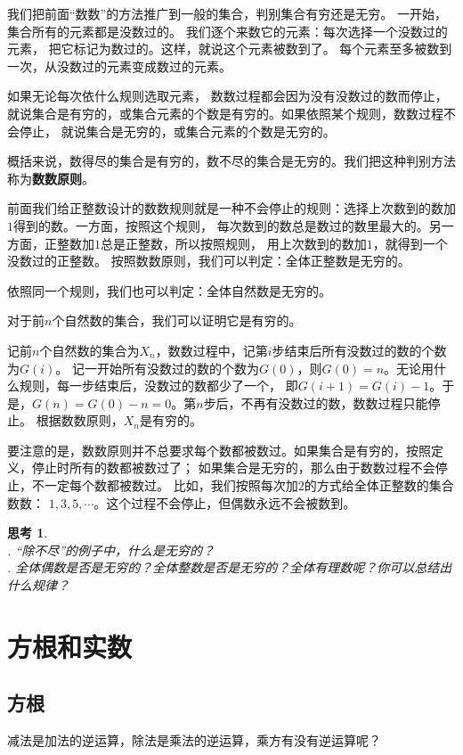 \documentclass[12pt,UTF8]{ctexbook}
\newtheorem{sk}{思考}[section]
\begin{document}
我们把前面“数数”的方法推广到一般的集合，判别集合有穷还是无穷。
一开始，集合所有的元素都是没数过的。
我们逐个来数它的元素：每次选择一个没数过的元素，
把它标记为数过的。这样，就说这个元素被数到了。
每个元素至多被数到一次，从没数过的元素变成数过的元素。

如果无论每次依什么规则选取元素，
数数过程都会因为没有没数过的数而停止，就说集合是有穷的，或集合元素的个数是有穷的。如果依照某个规则，数数过程不会停止，
就说集合是无穷的，或集合元素的个数是无穷的。

概括来说，数得尽的集合是有穷的，数不尽的集合是无穷的。我们把这种判别方法称为\textbf{数数原则}。

前面我们给正整数设计的数数规则就是一种不会停止的规则：选择上次数到的数加$1$得到的数。一方面，按照这个规则，
每次数到的数总是数过的数里最大的。另一方面，正整数加$1$总是正整数，所以按照规则，
用上次数到的数加$1$，就得到一个没数过的正整数。
按照数数原则，我们可以判定：全体正整数是无穷的。

依照同一个规则，我们也可以判定：全体自然数是无穷的。

对于前$n$个自然数的集合，我们可以证明它是有穷的。

记前$n$个自然数的集合为$X_n$，数数过程中，记第$i$步结束后所有没数过的数的个数为$G(i)$。
记一开始所有没数过的数的个数为$G(0)$，则$G(0) = n$。无论用什么规则，每一步结束后，没数过的数都少了一个，
即$G(i+1) = G(i) - 1$。于是，$G(n) = G(0) - n = 0$。第$n$步后，不再有没数过的数，数数过程只能停止。
根据数数原则，$X_n$是有穷的。

要注意的是，数数原则并不总要求每个数都被数过。如果集合是有穷的，按照定义，停止时所有的数都被数过了；
如果集合是无穷的，那么由于数数过程不会停止，不一定每个数都被数过。
比如，我们按照每次加$2$的方式给全体正整数的集合数数：
$1,3,5,\cdots$。这个过程不会停止，但偶数永远不会被数到。

\begin{sk}
    \mbox{}\\
    . “除不尽”的例子中，什么是无穷的？\\
    . 全体偶数是否是无穷的？全体整数是否是无穷的？全体有理数呢？你可以总结出什么规律？
\end{sk}

\chapter{方根和实数}

\section{方根}
减法是加法的逆运算，除法是乘法的逆运算，乘方有没有逆运算呢？
\end{document}
